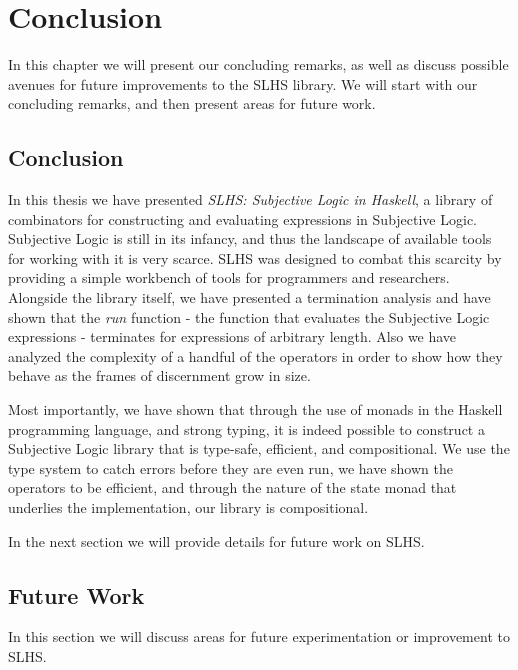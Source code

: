 \documentclass[thesis.tex]{subfiles}
\begin{document}
\chapter{Conclusion}
\label{chap:conclusion}

In this chapter we will present our concluding remarks, as well as discuss possible avenues for
future improvements to the SLHS library. We will start with our concluding remarks, and then
present areas for future work.



\section{Conclusion}

In this thesis we have presented \emph{SLHS: Subjective Logic in Haskell}, a library of
combinators for constructing and evaluating expressions in Subjective Logic. Subjective Logic
is still in its infancy, and thus the landscape of available tools for working with it is
very scarce. SLHS was designed to combat this scarcity by providing a simple workbench of
tools for programmers and researchers. Alongside the library itself, we have presented a
termination analysis and have shown that the \emph{run} function - the function that evaluates
the Subjective Logic expressions - terminates for expressions of arbitrary length. Also we have
analyzed the complexity of a handful of the operators in order to show how they behave as the
frames of discernment grow in size.

Most importantly, we have shown that through the use of monads in the Haskell programming language,
and strong typing, it is indeed possible to construct a Subjective Logic library that is type-safe,
efficient, and compositional. We use the type system to catch errors before they are even run,
we have shown the operators to be efficient, and through the nature of the state monad that underlies
the implementation, our library is compositional.

In the next section we will provide details for future work on SLHS.







\section{Future Work}

In this section we will discuss areas for future experimentation or improvement to SLHS.
\end{document}
